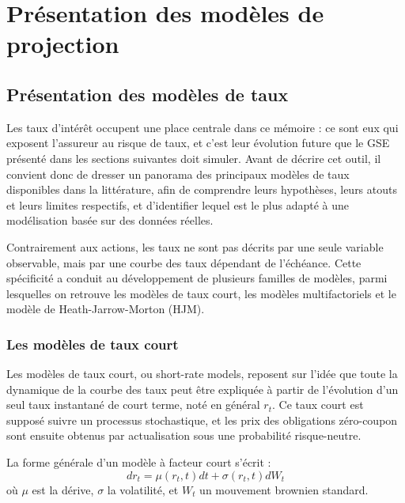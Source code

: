 \chapter{Présentation des modèles de projection}
\label{chap:presentation_des_modeles}

\section{Présentation des modèles de taux}

Les taux d'intérêt occupent une place centrale dans ce mémoire : ce sont eux qui exposent l'assureur au risque de taux, et c'est leur évolution future que le GSE présenté dans les sections suivantes doit simuler. Avant de décrire cet outil, il convient donc de dresser un panorama des principaux modèles de taux disponibles dans la littérature, afin de comprendre leurs hypothèses, leurs atouts et leurs limites respectifs, et d'identifier lequel est le plus adapté à une modélisation basée sur des données réelles.

Contrairement aux actions, les taux ne sont pas décrits par une seule variable observable, mais par une courbe des taux dépendant de l'échéance. Cette spécificité a conduit au développement de plusieurs familles de modèles, parmi lesquelles on retrouve les modèles de taux court, les modèles multifactoriels et le modèle de Heath-Jarrow-Morton (HJM).

\subsection{Les modèles de taux court}

Les modèles de taux court, ou short-rate models, reposent sur l'idée que toute la dynamique de la courbe des taux peut être expliquée à partir de l'évolution d'un seul taux instantané de court terme, noté en général $r_t$. Ce taux court est supposé suivre un processus stochastique, et les prix des obligations zéro-coupon sont ensuite obtenus par actualisation sous une probabilité risque-neutre.

La forme générale d'un modèle à facteur court s'écrit :
\begin{equation}
dr_t = \mu(r_t, t) dt + \sigma(r_t, t) dW_t
\end{equation}
où $\mu$ est la dérive, $\sigma$ la volatilité, et $W_t$ un mouvement brownien standard.

